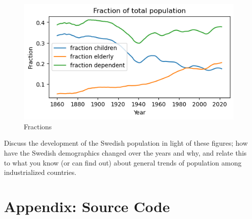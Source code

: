 \documentclass[a4paper]{article}
\begin{document}
\begin{figure}[h]
  \begin{center}
    \includegraphics[width=\textwidth]{fractions.png}
    \caption{Fractions}
    \label{fig:fractions}
  \end{center}
\end{figure}



Discuss the development of the Swedish population in light of these figures; how have the Swedish demographics changed over the years and why, and relate this to what you know (or can find out) about general trends of population among industrialized countries.



\printbibliography

\section*{Appendix: Source Code}

\end{document}
